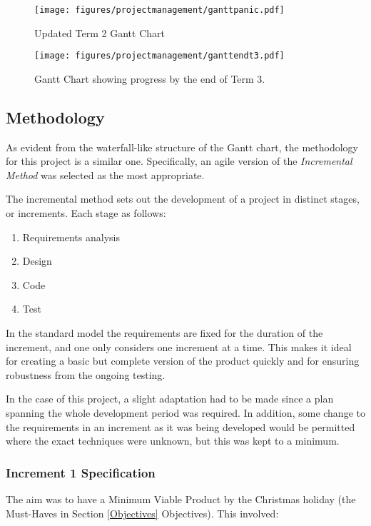 \documentclass[12pt, a4paper]{article}
\begin{document}
\begin{figure}
    \texttt{[image: figures/projectmanagement/ganttpanic.pdf]}
        \caption{Updated Term 2 Gantt Chart}
        \label{fig:gantt2}
\end{figure}

\begin{figure}
    \texttt{[image: figures/projectmanagement/ganttendt3.pdf]}
        \caption{Gantt Chart showing progress by the end of Term 3.}
        \label{fig:gantt3}
\end{figure}

\subsection{Methodology}
\label{methodology}
As evident from the waterfall-like structure of the Gantt chart, the methodology for this project is a similar one. Specifically, an agile version of the \textit{Incremental Method} \cite{management:incremental} was selected as the most appropriate. 

The incremental method sets out the development of a project in distinct stages, or increments. Each stage as follows:
\begin{enumerate}
    \item Requirements analysis
    \item Design
    \item Code 
    \item Test
\end{enumerate}
In the standard model the requirements are fixed for the duration of the increment, and one only considers one increment at a time. This makes it ideal for creating a basic but complete version of the product quickly and for ensuring robustness from the ongoing testing. 

In the case of this project, a slight adaptation had to be made since a plan spanning the whole development period was required. In addition, some change to the requirements in an increment as it was being developed would be permitted where the exact techniques were unknown, but this was kept to a minimum.  

\subsubsection{Increment 1 Specification}
The aim was to have a Minimum Viable Product by the Christmas holiday (the Must-Haves in Section \ref{Objectives} Objectives). This involved:
\end{document}
